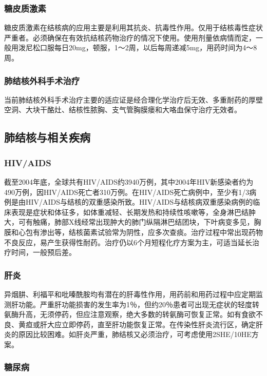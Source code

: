 \subsubsection{糖皮质激素}

糖皮质激素在结核病的应用主要是利用其抗炎、抗毒性作用。仅用于结核毒性症状严重者。必须确保在有效抗结核药物治疗的情况下使用。使用剂量依病情而定，一般用泼尼松口服每日20mg，顿服，1～2周，以后每周递减5mg，用药时间为4～8周。

\subsubsection{肺结核外科手术治疗}

当前肺结核外科手术治疗主要的适应证是经合理化学治疗后无效、多重耐药的厚壁空洞、大块干酪灶、结核性脓胸、支气管胸膜瘘和大咯血保守治疗无效者。

\subsection{肺结核与相关疾病}

\subsubsection{HIV/AIDS}

截至2004年底，全球共有HIV/AIDS约3940万例，其中2004年HIV新感染者约为490万例，因HIV/AIDS死亡者310万例。在HIV/AIDS死亡病例中，至少有1/3病例是由HIV/AIDS与结核的双重感染所致。HIV/AIDS与结核病双重感染病例的临床表现是症状和体征多，如体重减轻、长期发热和持续性咳嗽等，全身淋巴结肿大，可有触痛，肺部X线经常出现肿大的肺门纵隔淋巴结团块，下叶病变多见，胸膜和心包有渗出等，结核菌素试验常为阴性，应多次查痰。治疗过程中常出现药物不良反应，易产生获得性耐药。治疗仍以6个月短程化疗方案为主，可适当延长治疗时间，一般预后差。

\subsubsection{肝炎}

异烟肼、利福平和吡嗪酰胺均有潜在的肝毒性作用，用药前和用药过程中应定期监测肝功能。严重肝功能损害的发生率为1％，但约20％患者可出现无症状的轻度转氨酶升高，无须停药，但应注意观察，绝大多数的转氨酶可恢复正常。如有食欲不良、黄疸或肝大应立即停药，直至肝功能恢复正常。在传染性肝炎流行区，确定肝炎的原因比较困难。如肝炎严重，肺结核又必须治疗，可考虑使用2SHE/10HE方案。

\subsubsection{糖尿病}

